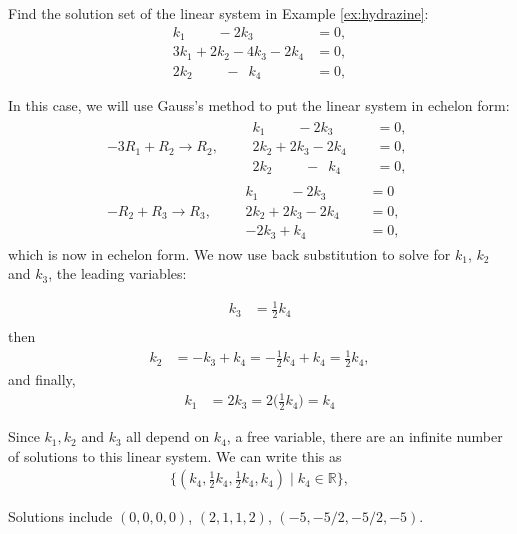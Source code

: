\begin{example}
Find the solution set of the linear system in Example \ref{ex:hydrazine}:
\begin{align*}
k_1\phantom{+2k_2}-2k_3\phantom{+2k_4} & = 0, \\
3k_1+2k_2-4k_3-2k_4 & = 0, \\
2k_2\phantom{+2x_3}-\phantom{2}k_4 & = 0,
\end{align*}

\solution

In this case, we will use Gauss's method to put the linear system in echelon form:
%
\begin{align*}
-3R_1 +R_2 \rightarrow R_2,  \qquad
\begin{split}
k_1 \phantom{+2k_2}- 2k_3\phantom{+2k_4} & = 0, \\
2k_2 + 2k_3 -2k_4 & = 0, \\
2k_2\phantom{+2x_3}-\phantom{2}k_4 & = 0,
\end{split} \\[12pt]
-R_2 + R_3 \rightarrow R_3, \qquad
\begin{split}
k_1 \phantom{+2k_2}- 2k_3\phantom{+2k_4} & = 0\\
2k_2 + 2k_3 -2k_4 & = 0, \\
-2k_3 + k_4 & = 0,
\end{split}
\end{align*}
which is now in echelon form.  We now use back substitution to solve for $k_1$, $k_2$ and $k_3$, the leading variables:

%
\begin{align*}
k_3 & = \frac{1}{2} k_4 \\
\end{align*}
then
\begin{align*}
k_2 & = -k_3 + k_4 = - \frac{1}{2} k_4 + k_4 = \frac{1}{2} k_4,
\end{align*}
and finally,
\begin{align*}
k_1 & = 2k_3 = 2 \biggl( \frac{1}{2} k_4 \biggr) = k_4
\end{align*}

Since $k_1, k_2$ and $k_3$ all depend on $k_4$, a free variable, there are an infinite number of solutions to this linear system.   We can write this as
%
\begin{align*}
\{ (k_4, \frac{1}{2} k_4, \frac{1}{2} k_4, k_4) \; | \; k_4 \in \mathbb{R} \},
\end{align*}

Solutions include $(0,0,0,0)$, $(2,1,1,2)$, $(-5,-5/2,-5/2,-5)$.

\end{example}

